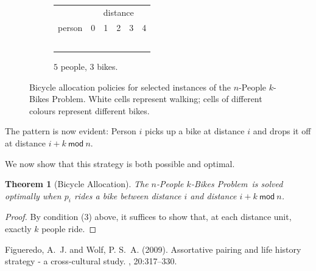 \documentclass[DIV=calc, paper=a4, fontsize=11pt, twocolumn]{scrartcl}	 %
\newcommand\prob{$n$-People $k$-Bikes Problem}
\begin{document}
\begin{figure}[t]
\begin{subfigure}[b]{0.38\textwidth}
\begin{tabular}{rp{1.5em}|p{1.5em}|p{1.5em}|p{1.5em}|p{1.5em}|}
		& \multicolumn{5}{c}{distance} \\
		person & \multicolumn{1}{|c|}{0} & \multicolumn{1}{c|}{1} & \multicolumn{1}{c|}{2} & \multicolumn{1}{c|}{3} & \multicolumn{1}{c|}{4} \\
		\hline
		\multicolumn{1}{r|}{\PA} &\BA&\BA&\BA&   & \\
		\cline{2-6}
		\multicolumn{1}{r|}{\PB} &   &\BB&\BB&\BB& \\
		\cline{2-6}
		\multicolumn{1}{r|}{\PC} &   &   &\BC&\BC&\BC\\
		\cline{2-6}
		\multicolumn{1}{r|}{\PD} &\BB&   &   &\BA&\BA\\
		\cline{2-6}
		\multicolumn{1}{r|}{\PE} &\BC&\BC&   &   &\BB\\
		\cline{2-6}
		\end{tabular}
		\caption{$5$ people, $3$ bikes.}
	\end{subfigure}
	\caption{Bicycle allocation policies for selected instances of the \prob. White cells represent walking; cells of different colours represent different bikes.}
	\label{fig:grids}
\end{figure}

The pattern is now evident: Person $i$ picks up a bike at distance $i$ and drops it off at distance $i+k~\mathsf{mod}~n$.

We now show that this strategy is both possible and optimal.

\newtheorem{theorem}{Theorem}

\begin{theorem}[Bicycle Allocation]
The \prob~is solved optimally when $p_i$ rides a bike between distance $i$ and distance $i+k~\mathsf{mod}~n$.
\end{theorem}
\begin{proof}
By condition (3) above, it suffices to show that, at each distance unit, exactly $k$ people ride.
\end{proof}



\begin{thebibliography}{99} %

Figueredo, A.~J. and Wolf, P. S.~A. (2009).
\newblock Assortative pairing and life history strategy - a cross-cultural
  study.
, 20:317--330.
 
\end{thebibliography}

\end{document}
